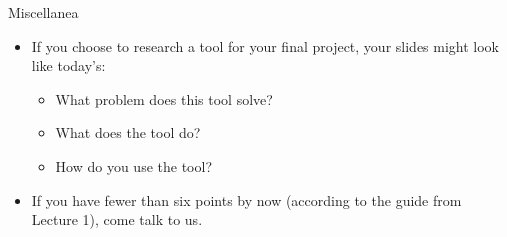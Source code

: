 \begin{frame}{Miscellanea}
  \begin{itemize}
    \item If you choose to research a tool for your final project, your slides
      might look like today's:
    \begin{itemize}
      \item What problem does this tool solve?
      \item What does the tool do?
      \item How do you use the tool?
    \end{itemize}
    \pause
    \item If you have fewer than six points by now (according to the guide from
      Lecture 1), come talk to us.
  \end{itemize}
\end{frame}


